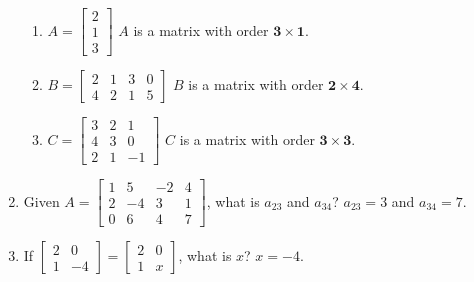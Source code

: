 \documentclass{report}
\begin{document}
\begin{multicols}{2}
\begin{enumerate}
\begin{enumerate}
                  \item $A = \begin{bmatrix}
                                2 \\
                                1 \\
                                3
                            \end{bmatrix}$
                        \sol{}
                        $A$ is a matrix with order $\mathbf{3 \times 1}$.

                  \item $B = \begin{bmatrix}
                                2 & 1 & 3 & 0 \\
                                4 & 2 & 1 & 5
                            \end{bmatrix}$
                        \sol{}
                        $B$ is a matrix with order $\mathbf{2 \times 4}$.

                  \item $C = \begin{bmatrix}
                                3 & 2 & 1  \\
                                4 & 3 & 0  \\
                                2 & 1 & -1
                            \end{bmatrix}$
                        \sol{}
                        $C$ is a matrix with order $\mathbf{3 \times 3}$.

              \end{enumerate}

        \item Given $A = \begin{bmatrix}
                      1 & 5  & -2 & 4 \\
                      2 & -4 & 3  & 1 \\
                      0 & 6  & 4  & 7
                  \end{bmatrix}$, what is $a_{23}$ and $a_{34}$?
              \sol{}
              $a_{23} = 3$ and $a_{34} = 7$.

        \item If $\begin{bmatrix}
                      2 & 0  \\
                      1 & -4
                  \end{bmatrix} = \begin{bmatrix}
                      2 & 0 \\
                      1 & x
                  \end{bmatrix}$, what is $x$?
              \sol{}
              $x = -4$.
    \end{enumerate}


\end{multicols}
\end{document}
